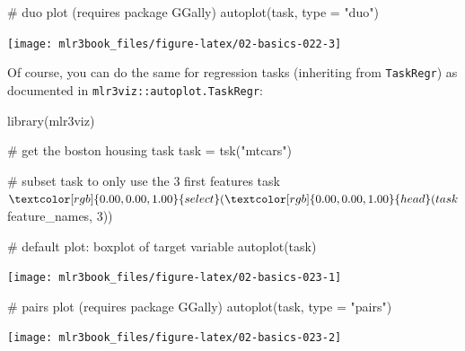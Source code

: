 \documentclass[
  11pt,
  parskip=half,
  DIV=calc,
  BCOR=10mm,
  x11names]{scrbook}
\newenvironment{Shaded}{}{}
\newcommand{\CommentTok}[1]{\textcolor[rgb]{0.00,0.50,0.00}{#1}}
\newcommand{\DataTypeTok}[1]{#1}
\newcommand{\DecValTok}[1]{#1}
\newcommand{\KeywordTok}[1]{\textcolor[rgb]{0.00,0.00,1.00}{#1}}
\newcommand{\NormalTok}[1]{#1}
\newcommand{\OperatorTok}[1]{#1}
\newcommand{\StringTok}[1]{\textcolor[rgb]{0.00,0.50,0.50}{#1}}
\begin{document}
\begin{Shaded}
\begin{Highlighting}[]

\CommentTok{# duo plot (requires package GGally)}
\KeywordTok{autoplot}\NormalTok{(task, }\DataTypeTok{type =} \StringTok{"duo"}\NormalTok{)}
\end{Highlighting}
\end{Shaded}

\begin{center}\texttt{[image: mlr3book\_files/figure-latex/02-basics-022-3]} \end{center}

Of course, you can do the same for regression tasks (inheriting from \texttt{TaskRegr}) as documented in \texttt{mlr3viz::autoplot.TaskRegr}:

\begin{Shaded}
\begin{Highlighting}[]
\KeywordTok{library}\NormalTok{(mlr3viz)}

\CommentTok{# get the boston housing task}
\NormalTok{task =}\StringTok{ }\KeywordTok{tsk}\NormalTok{(}\StringTok{"mtcars"}\NormalTok{)}

\CommentTok{# subset task to only use the 3 first features}
\NormalTok{task}\OperatorTok{$}\KeywordTok{select}\NormalTok{(}\KeywordTok{head}\NormalTok{(task}\OperatorTok{$}\NormalTok{feature_names, }\DecValTok{3}\NormalTok{))}

\CommentTok{# default plot: boxplot of target variable}
\KeywordTok{autoplot}\NormalTok{(task)}
\end{Highlighting}
\end{Shaded}

\begin{center}\texttt{[image: mlr3book\_files/figure-latex/02-basics-023-1]} \end{center}

\begin{Shaded}
\begin{Highlighting}[]

\CommentTok{# pairs plot (requires package GGally)}
\KeywordTok{autoplot}\NormalTok{(task, }\DataTypeTok{type =} \StringTok{"pairs"}\NormalTok{)}
\end{Highlighting}
\end{Shaded}

\begin{center}\texttt{[image: mlr3book\_files/figure-latex/02-basics-023-2]} \end{center}
\end{document}
